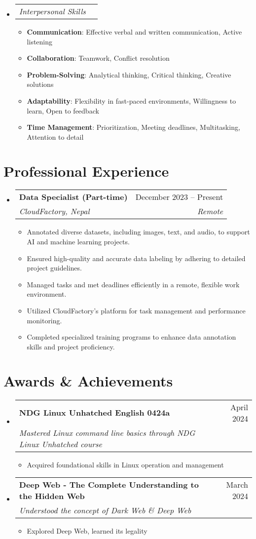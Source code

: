 \documentclass[letterpaper,11pt]{article}
\makeatletter
\newcommand{\resumeItem}[1]{
  \item\small{
    {#1 \vspace{-2pt}}
  }
}
\newcommand{\resumeSubheading}[4]{
  \vspace{-2pt}\item
    \begin{tabular*}{0.97\textwidth}[t]{l@{\extracolsep{\fill}}r}
      \textbf{#1} & #2 \\
      \textit{\small#3} & \textit{\small #4} \\
    \end{tabular*}\vspace{-7pt}
}
\newcommand{\resumeSubSubheading}[2]{
    \item
    \begin{tabular*}{0.97\textwidth}{l@{\extracolsep{\fill}}r}
      \textit{\small#1} & \textit{\small #2} \\
    \end{tabular*}\vspace{-7pt}
}
\newcommand{\resumeSubHeadingListStart}{\begin{itemize}[leftmargin=0.15in, label={}]}
\newcommand{\resumeSubHeadingListEnd}{\end{itemize}}
\newcommand{\resumeItemListStart}{\begin{itemize}}
\newcommand{\resumeItemListEnd}{\end{itemize}\vspace{-5pt}}
\makeatother
\begin{document}
\resumeSubHeadingListStart
  \resumeSubSubheading{Interpersonal Skills}{}
  \resumeItemListStart
    \resumeItem{\textbf{Communication}: Effective verbal and written communication, Active listening}
    \resumeItem{\textbf{Collaboration}: Teamwork, Conflict resolution}
    \resumeItem{\textbf{Problem-Solving}: Analytical thinking, Critical thinking, Creative solutions}
    \resumeItem{\textbf{Adaptability}: Flexibility in fast-paced environments, Willingness to learn, Open to feedback}
    \resumeItem{\textbf{Time Management}: Prioritization, Meeting deadlines, Multitasking, Attention to detail}
  \resumeItemListEnd
\resumeSubHeadingListEnd

\section{Professional Experience}
  \resumeSubHeadingListStart
    \resumeSubheading
      {Data Specialist (Part-time)}{December 2023 -- Present}
      {CloudFactory, Nepal}{Remote}
    \resumeItemListStart
        \resumeItem{Annotated diverse datasets, including images, text, and audio, to support AI and machine learning projects.}
        \resumeItem{Ensured high-quality and accurate data labeling by adhering to detailed project guidelines.}
        \resumeItem{Managed tasks and met deadlines efficiently in a remote, flexible work environment.}
        \resumeItem{Utilized CloudFactory’s platform for task management and performance monitoring.}
        \resumeItem{Completed specialized training programs to enhance data annotation skills and project proficiency.}
    \resumeItemListEnd
  \resumeSubHeadingListEnd

\section{Awards \& Achievements}
\resumeSubHeadingListStart
    \resumeSubheading
      {NDG Linux Unhatched English 0424a}{April 2024}
      {Mastered Linux command line basics through NDG Linux Unhatched course}{}
    \resumeItemListStart
        \resumeItem{Acquired foundational skills in Linux operation and management}
    \resumeItemListEnd
    
    \resumeSubheading
      {Deep Web - The Complete Understanding to the Hidden Web}{March 2024}
      {Understood the concept of Dark Web \& Deep Web}{}
    \resumeItemListStart
        \resumeItem{Explored Deep Web, learned its legality}
    \resumeItemListEnd
\resumeSubHeadingListEnd
\end{document}
